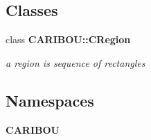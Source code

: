 \subsection*{Classes}
\begin{DoxyCompactItemize}
\item 
class {\bf C\-A\-R\-I\-B\-O\-U\-::\-C\-Region}
\begin{DoxyCompactList}\small\item\em a region is sequence of rectangles \end{DoxyCompactList}\end{DoxyCompactItemize}
\subsection*{Namespaces}
\begin{DoxyCompactItemize}
\item 
{\bf C\-A\-R\-I\-B\-O\-U}
\end{DoxyCompactItemize}

